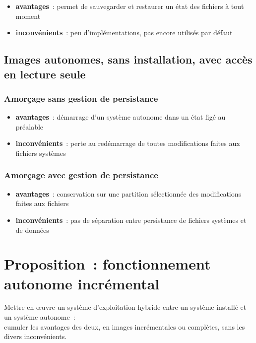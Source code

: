 \documentclass[10pt]{article}
\newenvironment{itmz}{\begin{itemize}
\setlength{\itemsep}{0em}
}{\end{itemize}}
\begin{document}
\begin{itmz}
\item{\textbf{avantages} : permet de sauvegarder et restaurer un état des fichiers à tout moment}
\item{\textbf{inconvénients} : peu d’implémentations, pas encore utilisés par défaut}
\end{itmz}

\subsection{Images autonomes, sans installation, avec accès en lecture seule}

\subsubsection{Amorçage sans gestion de persistance}

\begin{itmz}
\item{\textbf{avantages} : démarrage d’un système autonome dans un état figé au préalable}
\item{\textbf{inconvénients} : perte au redémarrage de toutes modifications faites aux fichiers systèmes}
\end{itmz}

\subsubsection{Amorçage avec gestion de persistance}

\begin{itmz}
\item{\textbf{avantages} : conservation sur une partition sélectionnée des modifications faites aux fichiers}
\item{\textbf{inconvénients} : pas de séparation entre persistance de fichiers systèmes et de données}
\end{itmz}

\section{Proposition : fonctionnement autonome incrémental}

Mettre en œuvre un système d’exploitation hybride entre un système installé et un système autonome :\\
cumuler les avantages des deux, en images incrémentales ou complètes, sans les divers inconvénients.
\end{document}
